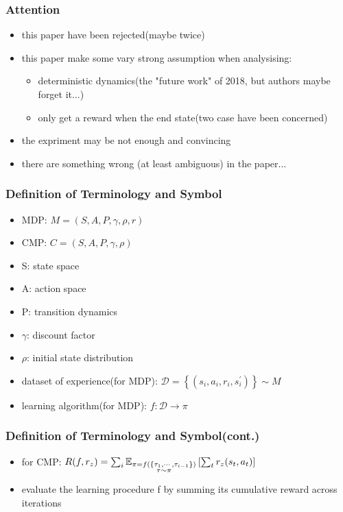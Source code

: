 \documentclass[aspectratio=169]{beamer}
\begin{document}
\begin{frame}
  \frametitle{Attention}
  \begin{itemize}
    \item this paper have been rejected(maybe twice)
    \item this paper make some vary strong assumption when analysising:
    \begin{itemize}
      \item deterministic dynamics(the "future work" of 2018, but authors maybe forget it...)
      \item only get a reward when the end state(two case have been concerned)
    \end{itemize}
    \item the expriment may be not enough and convincing
    \item there are something wrong (at least ambiguous) in the paper...
  \end{itemize}
\end{frame}


\begin{frame}
  \frametitle{Definition of Terminology and Symbol}
  \begin{itemize}
    \item MDP: $M=(S, A, P, \gamma, \rho, r)$
    \item CMP: $C=(S, A, P, \gamma, \rho)$
    \item S: state space 
    \item A: action space 
    \item P: transition dynamics 
    \item $\gamma$: discount factor
    \item $\rho$: initial state distribution 
    \item dataset of experience(for MDP): $\mathcal{D}=\left\{\left(s_{i}, a_{i}, r_{i}, s_{i}^{\prime}\right)\right\} \sim M$
    \item learning algorithm(for MDP): $f: \mathcal{D} \rightarrow \pi$
  \end{itemize}
\end{frame}

\begin{frame}
  \frametitle{Definition of Terminology and Symbol(cont.)}
  \begin{itemize}
    \item for CMP: $R(f, r_z) = \sum_i \mathbb{E}_{\substack{\pi = f(\{\tau_1, \cdots, \tau_{i-1}\}) \\ \tau \sim \pi}} \left[\sum_t r_z(s_t, a_t) \right]$
    \item evaluate the learning procedure f by summing its cumulative reward across iterations
  \end{itemize}
\end{frame}
\end{document}
